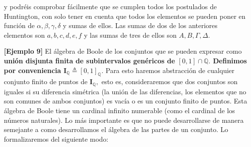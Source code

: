   y podréis comprobar fácilmente que se cumplen todos los postulados de
  Huntington, con solo tener en cuenta que todos los elementos se pueden
  poner en función de $\alpha, \beta, \gamma, \delta$ y sumas de ellos. Las
  sumas de dos de los anteriores elementos son $a, b, c, d, e, f$ y las sumas de
  tres de ellos son $A, B, \Gamma, \Delta.$

  \textbf{{[}Ejemplo 9{]}} El álgebra de Boole de los conjuntos que se
  pueden expresar como \textbf{unión disjunta finita de subintervalos
  genéricos de $[0,1] \cap \mathbb{Q}.$ Definimos por
  conveniencia
  $\mathbf{I}_{\mathbb{Q}} \triangleq [0,1]_{\mathbb{Q}}$}.
  Para esto haremos abstracción de cualquier conjunto finito de puntos
  de $\mathbf{I}_{\mathbb{Q}},$ esto es,
  consideraremos que dos conjuntos son iguales si su diferencia
  simétrica (la unión de las diferencias, los elementos que no son
  comunes de ambos conjuntos) es vacía o es un conjunto finito de
  puntos. Esta álgebra de Boole tiene un cardinal infinito numerable
  (como el cardinal de los números naturales). Lo más importante es que
  no puede desarrollarse de manera semejante a como desarrolla\-mos el
  álgebra de las partes de un conjunto. Lo formalizaremos del siguiente
  modo:

